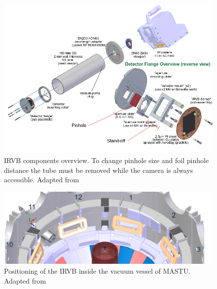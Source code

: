 \begin{figure}
	\centering
	\includegraphics[width=\linewidth]{Chapters/chapter2/figs/IRVB2.png}
	\caption{IRVB components overview. To change pinhole size and foil pinhole distance the tube must be removed while the camera is always accessible. Adapted from \cite{Reinke2017a}}
	\label{fig:IRVB_components}
\end{figure}

\begin{figure}
	\centering
	\includegraphics[width=\linewidth]{Chapters/chapter2/figs/where_irvb.png}
	\caption{Positioning of the IRVB inside the vacuum vessel of MASTU. Adapted from \cite{Reinke2017a}}
	\label{fig:IRVB_location}
\end{figure}



